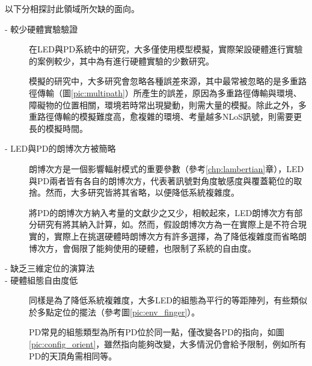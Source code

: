     


   

    


    

    

        
    

        




        
    以下分相探討此領域所欠缺的面向。
    
    \begin{description}

        \item[- 較少硬體實驗驗證]\hfill 
        
        \qquad
        在LED與PD系統中的研究，大多僅使用模型模擬，實際架設硬體進行實驗的案例較少，其中\cite{case:hypercube}\cite{case:3d_layers}為有進行硬體實驗的少數研究。

        \qquad
        模擬的研究中，大多研究會忽略各種誤差來源，其中最常被忽略的是多重路徑傳輸（圖\ref{pic:multipath}）所產生的誤差，原因為多重路徑傳輸與環境、障礙物的位置相關，環境若時常出現變動，則需大量的模擬。除此之外，多重路徑傳輸的模擬難度高，愈複雜的環境、考量越多NLoS訊號，則需要更長的模擬時間。

        \item[- LED與PD的朗博次方被簡略]\hfill 
        
        \qquad
        朗博次方是一個影響輻射模式的重要參數（參考\ref{chp:lambertian}章），LED與PD兩者皆有各自的朗博次方，代表著訊號對角度敏感度與覆蓋範位的取捨。然而，大多研究皆將其省略，以便降低系統複雜度。
        
        \qquad
        將PD的朗博次方納入考量的文獻少之又少，相較起來，LED朗博次方有部分研究有將其納入計算，如\cite{case:cart2d}\cite{case:cart3d}。然而，假設朗博次方為一在實際上是不符合現實的，實際上在挑選硬體時朗博次方有許多選擇，為了降低複雜度而省略朗博次方，會侷限了能夠使用的硬體，也限制了系統的自由度。

        \item[- 缺乏三維定位的演算法]\hfill 
        
        \qquad

        \item[- 硬體組態自由度低]\hfill 
        
        \qquad
        同樣是為了降低系統複雜度，大多LED的組態為平行的等距陣列，有些類似於多點定位的擺法（參考圖\ref{pic:env_finger}）。

        \qquad
        PD常見的組態類型為所有PD位於同一點，僅改變各PD的指向，如圖\ref{pic:config_orient}，雖然指向能夠改變，大多情況仍會給予限制，例如所有PD的天頂角需相同等。


\end{description}
